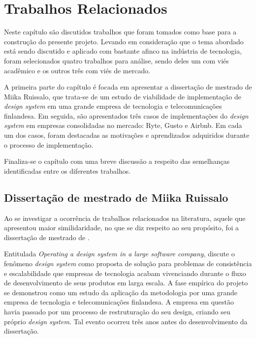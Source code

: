
\chapter{Trabalhos Relacionados}
\label{chap:trabRelac}

Neste capítulo são discutidos trabalhos que foram tomados como base para a construção do presente projeto. Levando em consideração que o tema abordado está sendo discutido e aplicado com bastante afinco na indústria de tecnologia, foram selecionados quatro trabalhos para análise, sendo deles um com viés acadêmico e os outros três com viés de mercado. 

A primeira parte do capítulo é focada em apresentar a dissertação de mestrado de Miika Ruissalo, que trata-se de um estudo de viabilidade de implementação de \textit{design system} em uma grande empresa de tecnologia e telecomunicações finlandesa. Em seguida, são apresentados três casos de implementações do \textit{design system} em empresas consolidadas no mercado: Ryte, Gusto e Airbnb. Em cada um dos casos, foram destacadas as motivações e aprendizados adquiridos durante o processo de implementação.

Finaliza-se o capítulo com uma breve discussão a respeito das semelhanças identificadas entre os diferentes trabalhos.

\section{Dissertação de mestrado de Miika Ruissalo}
\label{sec:teseMestrado}

Ao se investigar a ocorrência de trabalhos relacionados na literatura, aquele que apresentou maior similidaridade, no que se diz respeito ao seu propósito, foi a dissertação de mestrado de .

Entitulada \textit{Operating a design system in a large software company},  discute o fenômeno \textit{design system} como proposta de solução para problemas de consistência e escalabilidade que empresas de tecnologia acabam vivenciando durante o fluxo de desenvolvimento de seus produtos em larga escala. A fase empírica do projeto se demonstrou como um estudo da aplicação da metodologia por uma grande empresa de tecnologia e telecomunicações finlandesa. A empresa em questão havia passado por um processo de restruturação do seu design, criando seu próprio \textit{design system}. Tal evento ocorreu três anos antes do desenvolvimento da dissertação.

